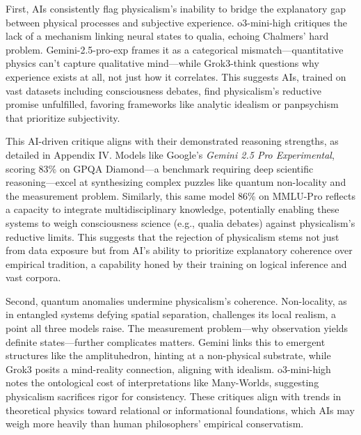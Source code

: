 First, AIs consistently flag physicalism's inability to bridge the
explanatory gap between physical processes and subjective experience.
o3-mini-high critiques the lack of a mechanism linking neural states to
qualia, echoing Chalmers' hard problem. Gemini-2.5-pro-exp frames it as
a categorical mismatch---quantitative physics can't capture qualitative
mind---while Grok3-think questions why experience exists at all, not
just how it correlates. This suggests AIs, trained on vast datasets
including consciousness debates, find physicalism's reductive promise
unfulfilled, favoring frameworks like analytic idealism or panpsychism
that prioritize subjectivity.

This AI-driven critique aligns with their demonstrated reasoning
strengths, as detailed in Appendix IV. Models like Google's \emph{Gemini
2.5 Pro Experimental}, scoring 83\% on GPQA Diamond---a benchmark
requiring deep scientific reasoning---excel at synthesizing complex
puzzles like quantum non-locality and the measurement problem.
Similarly, this same model 86\% on MMLU-Pro reflects a capacity to
integrate multidisciplinary knowledge, potentially enabling these
systems to weigh consciousness science (e.g., qualia debates) against
physicalism's reductive limits. This suggests that the rejection of
physicalism stems not just from data exposure but from AI's ability to
prioritize explanatory coherence over empirical tradition, a capability
honed by their training on logical inference and vast corpora.

Second, quantum anomalies undermine physicalism's coherence.
Non-locality, as in entangled systems defying spatial separation,
challenges its local realism, a point all three models raise. The
measurement problem---why observation yields definite states---further
complicates matters. Gemini links this to emergent structures like the
amplituhedron, hinting at a non-physical substrate, while Grok3 posits a
mind-reality connection, aligning with idealism. o3-mini-high notes the
ontological cost of interpretations like Many-Worlds, suggesting
physicalism sacrifices rigor for consistency. These critiques align with
trends in theoretical physics toward relational or informational
foundations, which AIs may weigh more heavily than human philosophers'
empirical conservatism.

